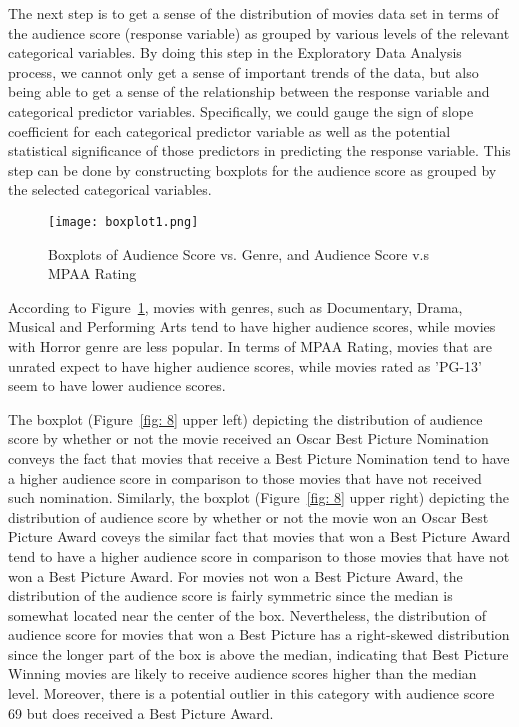 The next step is to get a sense of the distribution of movies data set in terms of the audience score (response variable) as grouped by various levels of the relevant categorical variables. By doing this step in the Exploratory Data Analysis process, we cannot only get a sense of important trends of the data, but also being able to get a sense of the relationship between the response variable and categorical predictor variables. Specifically, we could gauge the sign of slope coefficient for each categorical predictor variable as well as the potential statistical significance of those predictors in predicting the response variable. This step can be done by constructing boxplots for the audience score as grouped by the selected categorical variables.

\begin{figure}[htbp]
\begin{center}
\caption{Boxplots of Audience Score vs. Genre, and Audience Score v.s MPAA Rating}
\texttt{[image: boxplot1.png]}
\label{fig: 7}
\end{center}
\end{figure}

According to Figure~\ref{fig: 7}, movies with genres, such as Documentary, Drama, Musical 
and Performing Arts tend to have higher audience scores, while movies with Horror genre are 
less popular. In terms of MPAA Rating, movies that are unrated expect to have higher audience scores, while movies rated as 'PG-13' seem to have lower audience scores.

The boxplot (Figure~\ref{fig: 8} upper left) depicting the distribution of audience score by whether or not the movie received an Oscar Best Picture Nomination conveys the fact that movies that receive a Best Picture Nomination tend to have a higher audience score in comparison to those movies that have not received such nomination. Similarly, the boxplot (Figure~\ref{fig: 8} upper right) depicting the distribution of audience score by whether or not the movie won an Oscar Best Picture Award coveys the similar fact that movies that won a Best Picture Award tend to have a higher audience score in comparison to those movies that have not won a Best Picture Award. For movies not won a Best Picture Award, the distribution of the audience score is fairly symmetric since the median is somewhat located near the center of the box. Nevertheless, the distribution of audience score for movies that won a Best Picture has a right-skewed distribution since the longer part of the box is above the median, indicating that Best Picture Winning movies are likely to receive audience scores higher than the median level. Moreover, there is a potential outlier in this category with audience score  69 but does received a Best Picture Award. 

